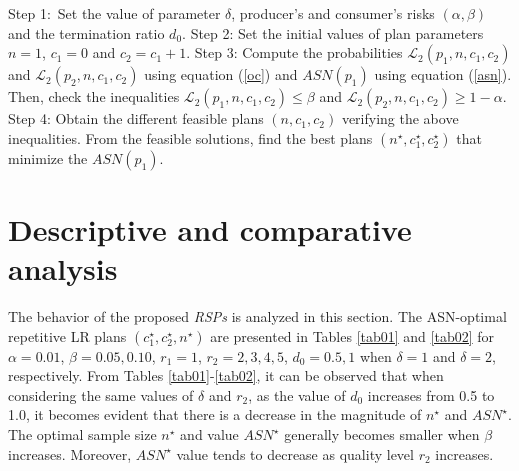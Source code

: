 \documentclass[twoside]{article}
\begin{document}
Step 1:~Set the value of parameter $\delta$, producer's and consumer's risks $(\alpha,\beta)$ and the termination ratio $d_0$.
Step 2: Set the initial values of plan parameters $n=1$, $c_1=0$ and $c_2=c_1+1$.
Step 3: Compute the probabilities $\mathcal{L}_2(p_1,n,c_1,c_2)$ and $\mathcal{L}_2(p_2,n,c_1,c_2)$ using equation (\ref{oc}) and $ASN(p_1)$ using equation (\ref{asn}). Then, check the inequalities $\mathcal{L}_2(p_1,n,c_1,c_2)\leq \beta$ and $\mathcal{L}_2(p_2,n,c_1,c_2)\geq 1-\alpha$.
Step 4: Obtain the different feasible plans $(n, c_1, c_2)$ verifying the above inequalities. From the feasible solutions, find the best plans $(n^{\star}, c_1^{\star}, c_2^{\star})$ that minimize the $ASN(p_1)$.


\section{Descriptive and comparative analysis}
The behavior of the proposed \textit{RSPs} is analyzed in this section. 
%
The ASN-optimal repetitive LR plans  $(c_1^{\star},c_2^{\star},n^{\star})$ are presented in   Tables \ref{tab01} and \ref{tab02}   for $\alpha=0.01$, $\beta=0.05,0.10$, $r_1=1$, $r_2=2,3,4,5$, $d_0=0.5,1$ when $\delta=1$ and $\delta=2$, respectively.
%
From  Tables \ref{tab01}-\ref{tab02}, it can be observed that when considering the same values of $\delta$ and $r_2$, as the value of $d_0$ increases from 0.5 to 1.0, it becomes evident that there is a decrease in the magnitude of $n^{\star}$ and $ASN^{\star}$.  The optimal sample size $n^{\star}$ and value $ASN^{\star}$ generally becomes smaller when    $\beta$ increases. Moreover,  $ASN^{\star}$ value tends to decrease as  quality level $r_2$ increases. 
\end{document}
